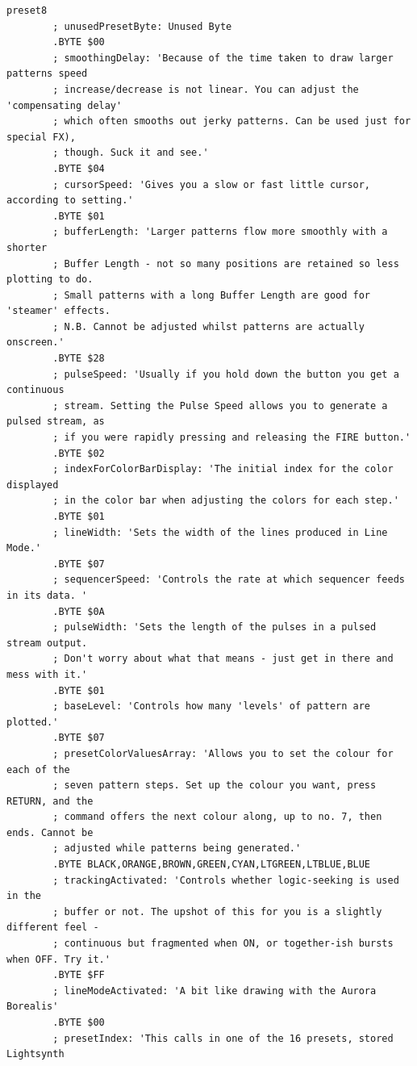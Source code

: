 \begin{lstlisting}[basicstyle=\ttfamily\tiny,caption=Source code for Preset 8.]
preset8
        ; unusedPresetByte: Unused Byte
        .BYTE $00
        ; smoothingDelay: 'Because of the time taken to draw larger patterns speed
        ; increase/decrease is not linear. You can adjust the 'compensating delay'
        ; which often smooths out jerky patterns. Can be used just for special FX),
        ; though. Suck it and see.'
        .BYTE $04
        ; cursorSpeed: 'Gives you a slow or fast little cursor, according to setting.'
        .BYTE $01
        ; bufferLength: 'Larger patterns flow more smoothly with a shorter
        ; Buffer Length - not so many positions are retained so less plotting to do.
        ; Small patterns with a long Buffer Length are good for 'steamer' effects.
        ; N.B. Cannot be adjusted whilst patterns are actually onscreen.'
        .BYTE $28
        ; pulseSpeed: 'Usually if you hold down the button you get a continuous
        ; stream. Setting the Pulse Speed allows you to generate a pulsed stream, as
        ; if you were rapidly pressing and releasing the FIRE button.'
        .BYTE $02
        ; indexForColorBarDisplay: 'The initial index for the color displayed
        ; in the color bar when adjusting the colors for each step.'
        .BYTE $01
        ; lineWidth: 'Sets the width of the lines produced in Line Mode.'
        .BYTE $07
        ; sequencerSpeed: 'Controls the rate at which sequencer feeds in its data. '
        .BYTE $0A
        ; pulseWidth: 'Sets the length of the pulses in a pulsed stream output.
        ; Don't worry about what that means - just get in there and mess with it.'
        .BYTE $01
        ; baseLevel: 'Controls how many 'levels' of pattern are plotted.'
        .BYTE $07
        ; presetColorValuesArray: 'Allows you to set the colour for each of the
        ; seven pattern steps. Set up the colour you want, press RETURN, and the
        ; command offers the next colour along, up to no. 7, then ends. Cannot be
        ; adjusted while patterns being generated.'
        .BYTE BLACK,ORANGE,BROWN,GREEN,CYAN,LTGREEN,LTBLUE,BLUE
        ; trackingActivated: 'Controls whether logic-seeking is used in the
        ; buffer or not. The upshot of this for you is a slightly different feel -
        ; continuous but fragmented when ON, or together-ish bursts when OFF. Try it.'
        .BYTE $FF
        ; lineModeActivated: 'A bit like drawing with the Aurora Borealis'
        .BYTE $00
        ; presetIndex: 'This calls in one of the 16 presets, stored Lightsynth

\end{lstlisting}
